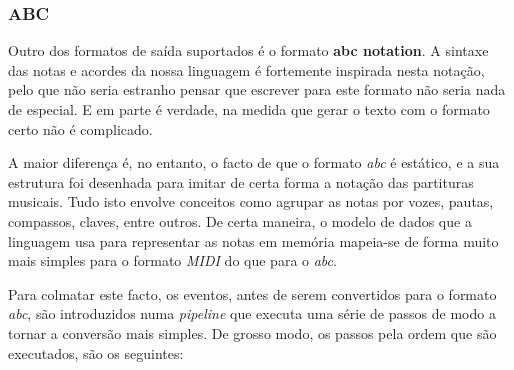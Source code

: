 \subsubsection{ABC}
Outro dos formatos de saída suportados é o formato \textbf{abc notation}. A sintaxe das notas e acordes da nossa linguagem é fortemente inspirada nesta notação, pelo que não seria estranho pensar que escrever para este formato não seria nada de especial. E em parte é verdade, na medida que gerar o texto com o formato certo não é complicado.

A maior diferença é, no entanto, o facto de que o formato \textit{abc} é estático, e a sua estrutura foi desenhada para imitar de certa forma a notação das partituras musicais. Tudo isto envolve conceitos como agrupar as notas por vozes, pautas, compassos, claves, entre outros. De certa maneira, o modelo de dados que a linguagem usa para representar as notas em memória mapeia-se de forma muito mais simples para o formato \textit{MIDI} do que para o \textit{abc}.

Para colmatar este facto, os eventos, antes de serem convertidos para o formato \textit{abc}, são introduzidos numa \textit{pipeline} que executa uma série de passos de modo a tornar a conversão mais simples. De grosso modo, os passos pela ordem que são executados, são os seguintes:

